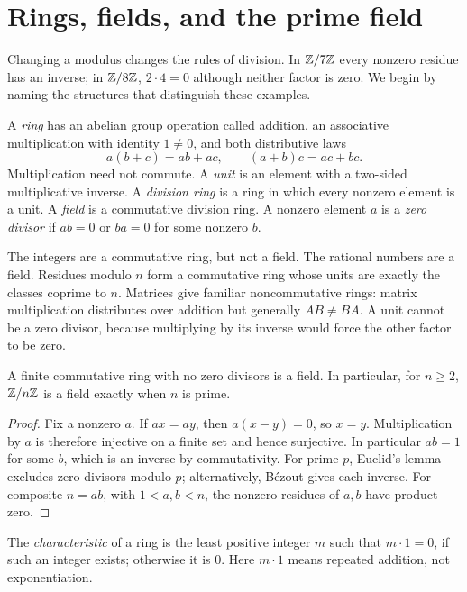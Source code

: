 \section{Rings, fields, and the prime field}
\label{sec:finite-field-foundations}

Changing a modulus changes the rules of division. In $\mathbb Z/7\mathbb Z$ every
nonzero residue has an inverse; in $\mathbb Z/8\mathbb Z$, $2\cdot4=0$ although
neither factor is zero. We begin by naming the structures that distinguish
these examples.

\begin{definition}
A \emph{ring} has an abelian group operation called addition, an associative
multiplication with identity $1\ne0$, and both distributive laws
\[
a(b+c)=ab+ac,\qquad (a+b)c=ac+bc.
\]
Multiplication need not commute. A \emph{unit} is an element with a
two-sided multiplicative inverse. A \emph{division ring} is a ring in
which every nonzero element is a unit. A \emph{field} is a commutative
division ring. A nonzero element $a$ is a \emph{zero divisor} if
$ab=0$ or $ba=0$ for some nonzero $b$.
\end{definition}

The integers are a commutative ring, but not a field. The rational numbers
are a field. Residues modulo $n$ form a commutative ring whose units are
exactly the classes coprime to $n$. Matrices give familiar noncommutative
rings: matrix multiplication distributes over addition but generally
$AB\ne BA$. A unit cannot be a zero divisor, because multiplying by its
inverse would force the other factor to be zero.

\begin{proposition}
A finite commutative ring with no zero divisors is a field. In particular,
for $n\ge2$, $\mathbb Z/n\mathbb Z$ is a field exactly when $n$ is prime.
\end{proposition}
\begin{proof}
Fix a nonzero $a$. If $ax=ay$, then $a(x-y)=0$, so $x=y$.
Multiplication by $a$ is therefore injective on a finite set and hence
surjective. In particular $ab=1$ for some $b$, which is an inverse by
commutativity. For prime $p$, Euclid's lemma excludes zero divisors modulo
$p$; alternatively, B\'ezout gives each inverse. For composite $n=ab$,
with $1<a,b<n$, the nonzero residues of $a,b$ have product zero.
\end{proof}

\begin{definition}
The \emph{characteristic} of a ring is the least positive integer $m$
such that $m\cdot1=0$, if such an integer exists; otherwise it is $0$.
Here $m\cdot1$ means repeated addition, not exponentiation.
\end{definition}

